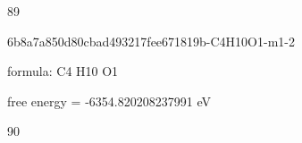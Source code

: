 \documentclass{article}
\begin{document}
89

\vspace{1cm}


6b8a7a850d80cbad493217fee671819b-C4H10O1-m1-2



formula: C4 H10 O1



free energy = -6354.820208237991 eV

90
\end{document}
